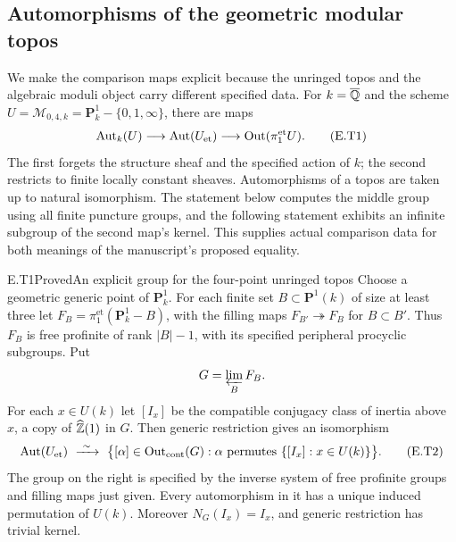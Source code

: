 \subsection{Automorphisms of the geometric modular topos}
\label{sec:modular-topos}

We make the comparison maps explicit because the unringed topos and the
algebraic moduli object carry different specified data.  For
$k=\overline{\mathbb Q}$ and the scheme
$U=\mathcal M_{0,4,k}=\mathbf P^1_k-\{0,1,\infty\}$, there are maps
\[
 \operatorname{Aut}_k(U)\longrightarrow\operatorname{Aut}(U_{\mathrm{et}})
       \longrightarrow\operatorname{Out}(\pi_1^{\mathrm{et}}U).
 \tag{E.T1}
\]
The first forgets the structure sheaf and the specified action of $k$;
the second restricts to finite locally constant sheaves.  Automorphisms
of a topos are taken up to natural isomorphism.  The statement below
computes the middle group using all finite puncture groups, and the
following statement exhibits an infinite subgroup of the second
map's kernel.  This supplies actual comparison data for both meanings
of the manuscript's proposed equality.

\begin{result}{E.T1}{Proved}{An explicit group for the four-point unringed topos}
Choose a geometric generic point of $\mathbf P^1_k$.  For each finite
set $B\subset\mathbf P^1(k)$ of size at least three let
$F_B=\pi_1^{\mathrm{et}}(\mathbf P^1_k-B)$, with the filling maps
$F_{B'}\twoheadrightarrow F_B$ for $B\subset B'$.  Thus $F_B$ is free
profinite of rank $|B|-1$, with its specified peripheral procyclic
subgroups.  Put
\[
 G=\varprojlim_B F_B.
\]
For each $x\in U(k)$ let $[I_x]$ be the compatible conjugacy class of
inertia above $x$, a copy of $\widehat{\mathbb Z}(1)$ in $G$.  Then generic
restriction gives an isomorphism
\[
 \operatorname{Aut}(U_{\mathrm{et}})\ \xrightarrow{\ \sim\ }\
 \bigl\{[\alpha]\in\operatorname{Out}_{\mathrm{cont}}(G):
   \alpha\text{ permutes }\{[I_x]:x\in U(k)\}\bigr\}.
 \tag{E.T2}
\]
The group on the right is specified by the inverse system of free
profinite groups and filling maps just given.  Every automorphism in
it has a unique induced permutation of $U(k)$.  Moreover
$N_G(I_x)=I_x$, and generic restriction has trivial kernel.
\end{result}

